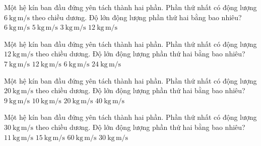 

\begin{ex}
Một hệ kín ban đầu đứng yên tách thành hai phần. Phần thứ nhất có động lượng $6\ \mathrm{kg\,m/s}$ theo chiều dương. Độ lớn động lượng phần thứ hai bằng bao nhiêu?
\choice
{\True $6\ \mathrm{kg\,m/s}$}
{$5\ \mathrm{kg\,m/s}$}
{$3\ \mathrm{kg\,m/s}$}
{$12\ \mathrm{kg\,m/s}$}
\end{ex}

\begin{ex}
Một hệ kín ban đầu đứng yên tách thành hai phần. Phần thứ nhất có động lượng $12\ \mathrm{kg\,m/s}$ theo chiều dương. Độ lớn động lượng phần thứ hai bằng bao nhiêu?
\choice
{$7\ \mathrm{kg\,m/s}$}
{\True $12\ \mathrm{kg\,m/s}$}
{$6\ \mathrm{kg\,m/s}$}
{$24\ \mathrm{kg\,m/s}$}
\end{ex}

\begin{ex}
Một hệ kín ban đầu đứng yên tách thành hai phần. Phần thứ nhất có động lượng $20\ \mathrm{kg\,m/s}$ theo chiều dương. Độ lớn động lượng phần thứ hai bằng bao nhiêu?
\choice
{$9\ \mathrm{kg\,m/s}$}
{$10\ \mathrm{kg\,m/s}$}
{\True $20\ \mathrm{kg\,m/s}$}
{$40\ \mathrm{kg\,m/s}$}
\end{ex}

\begin{ex}
Một hệ kín ban đầu đứng yên tách thành hai phần. Phần thứ nhất có động lượng $30\ \mathrm{kg\,m/s}$ theo chiều dương. Độ lớn động lượng phần thứ hai bằng bao nhiêu?
\choice
{$11\ \mathrm{kg\,m/s}$}
{$15\ \mathrm{kg\,m/s}$}
{$60\ \mathrm{kg\,m/s}$}
{\True $30\ \mathrm{kg\,m/s}$}
\end{ex}

